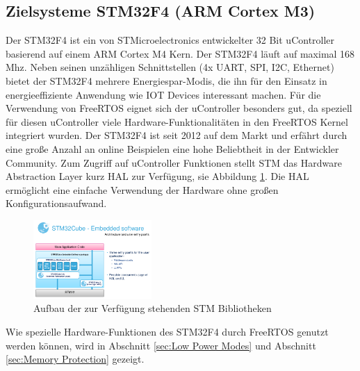 \subsection{Zielsysteme STM32F4 (ARM Cortex M3)}
Der STM32F4 ist ein von STMicroelectronics entwickelter 32 Bit uController basierend auf einem ARM Cortex M4 Kern. Der STM32F4 läuft auf maximal 168 Mhz. Neben seinen unzähligen Schnittstellen (4x UART, SPI, I2C, Ethernet) bietet der STM32F4 mehrere Energiespar-Modis, die ihn für den Einsatz in energieeffiziente Anwendung wie IOT Devices interessant machen. Für die Verwendung von FreeRTOS eignet sich der uController besonders gut, da speziell für diesen uController viele Hardware-Funk\-tio\-na\-li\-tät\-en in den FreeRTOS Kernel integriert wurden. Der STM32F4 ist seit 2012 auf dem Markt und erfährt durch eine große Anzahl an online Beispielen eine hohe Beliebtheit in der Entwickler Community. Zum Zugriff auf uController Funktionen stellt STM das Hardware Abstraction Layer kurz HAL zur Verfügung, sie Abbildung \ref{fig:HAL}. Die HAL ermöglicht eine einfache Verwendung der Hardware ohne großen Konfigurationsaufwand.     
\begin{figure}[htb!]
	\centering
		\includegraphics[width=0.4\textwidth]{Pictures/STM32F4/LibraryEntry.png}
	\caption{Aufbau der zur Verfügung stehenden STM Bibliotheken }
	\label{fig:HAL}
\end{figure}
Wie spezielle Hardware-Funktionen des STM32F4 durch FreeRTOS genutzt werden können, wird in Abschnitt \ref{sec:Low Power Modes} und Abschnitt \ref{sec:Memory Protection} gezeigt.